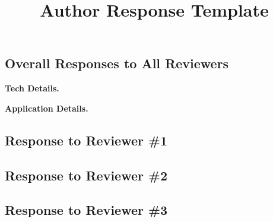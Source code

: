\documentclass[10pt,twocolumn,letterpaper]{article}
\begin{document}
\title{Author Response Template}  %

\maketitle

\subsection*{\normalsize \bf  Overall Responses to All Reviewers}
\textbf{Tech Details.}

\textbf{Application Details.}


\subsection*{\normalsize \bf  Response to Reviewer \#1}
\vspace{-1mm}

\subsection*{\normalsize \bf  Response to Reviewer \#2}
\vspace{-1mm}

\subsection*{\normalsize \bf  Response to Reviewer \#3}
\vspace{-1mm}
\end{document}
